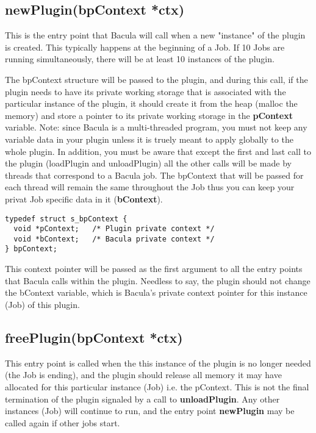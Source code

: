 \subsection{newPlugin(bpContext *ctx)}
  This is the entry point that Bacula will call
  when a new "instance" of the plugin is created. This typically
  happens at the beginning of a Job.  If 10 Jobs are running
  simultaneously, there will be at least 10 instances of the
  plugin.

  The bpContext structure will be passed to the plugin, and
  during this call, if the plugin needs to have its private
  working storage that is associated with the particular
  instance of the plugin, it should create it from the heap
  (malloc the memory) and store a pointer to
  its private working storage in the {\bf pContext} variable.
  Note: since Bacula is a multi-threaded program, you must not
  keep any variable data in your plugin unless it is truely meant
  to apply globally to the whole plugin.  In addition, you must
  be aware that except the first and last call to the plugin
  (loadPlugin and unloadPlugin) all the other calls will be 
  made by threads that correspond to a Bacula job.  The 
  bpContext that will be passed for each thread will remain the
  same throughout the Job thus you can keep your privat Job specific
  data in it ({\bf bContext}).

\begin{verbatim}
typedef struct s_bpContext {
  void *pContext;   /* Plugin private context */
  void *bContext;   /* Bacula private context */
} bpContext;

\end{verbatim}
   
  This context pointer will be passed as the first argument to all
  the entry points that Bacula calls within the plugin.  Needless
  to say, the plugin should not change the bContext variable, which
  is Bacula's private context pointer for this instance (Job) of this
  plugin.

\subsection{freePlugin(bpContext *ctx)}
This entry point is called when the
this instance of the plugin is no longer needed (the Job is
ending), and the plugin should release all memory it may
have allocated for this particular instance (Job) i.e. the pContext.  
This is not the final termination
of the plugin signaled by a call to {\bf unloadPlugin}. 
Any other instances (Job) will
continue to run, and the entry point {\bf newPlugin} may be called
again if other jobs start.

